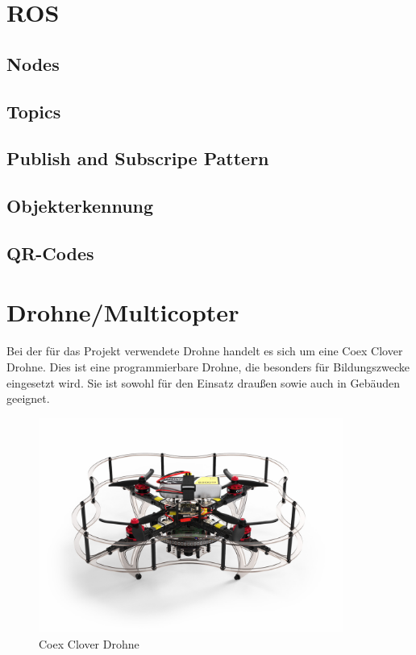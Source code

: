 \section{ROS} \label{ros:section}

    \subsection{Nodes} \label{nodes:subsection}

    \subsection{Topics} \label{topics:subsection}

    \subsection{Publish and Subscripe Pattern} \label{publish_and_subscripe_pattern:subsection}

    \subsection{Objekterkennung} \label{objekterkennung:subsection}

    \subsection{QR-Codes} \label{qr-codes:subsection}

\section{Drohne/Multicopter} \label{drohne:section}
Bei der für das Projekt verwendete Drohne handelt es sich um eine Coex Clover Drohne. Dies ist eine programmierbare Drohne, die besonders für Bildungszwecke eingesetzt wird. Sie ist sowohl für den Einsatz draußen sowie auch in Gebäuden geeignet. \\

\begin{figure}[htpb]
    \centering
    \includegraphics[width=10cm,keepaspectratio,angle=0]{images/coex_clover.jpg}
    \caption[Coex Clover Drohne]{\label{img coex_clover} Coex Clover Drohne \cite{img_coex_clover}}
\end{figure}

